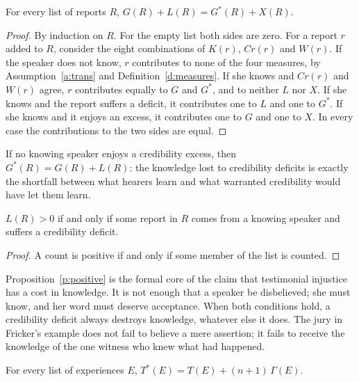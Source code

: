 \documentclass{situationist-preprint}
\begin{document}
\begin{theorem}[Accounting]\label{t:account}
For every list of reports $R$, $G(R) + L(R) = G^{*}(R) + X(R)$.
\end{theorem}

\begin{proof}
By induction on $R$. For the empty list both sides are zero. For a report $r$ added to $R$, consider the eight combinations of $K(r)$, $\mathit{Cr}(r)$ and $W(r)$. If the speaker does not know, $r$ contributes to none of the four measures, by Assumption~\ref{a:trans} and Definition~\ref{d:measures}. If she knows and $\mathit{Cr}(r)$ and $W(r)$ agree, $r$ contributes equally to $G$ and $G^{*}$, and to neither $L$ nor $X$. If she knows and the report suffers a deficit, it contributes one to $L$ and one to $G^{*}$. If she knows and it enjoys an excess, it contributes one to $G$ and one to $X$. In every case the contributions to the two sides are equal.
\end{proof}

\begin{corollary}[Shortfall]\label{c:shortfall}
If no knowing speaker enjoys a credibility excess, then $G^{*}(R) = G(R) + L(R)$: the knowledge lost to credibility deficits is exactly the shortfall between what hearers learn and what warranted credibility would have let them learn.
\end{corollary}

\begin{proposition}\label{p:positive}
$L(R) > 0$ if and only if some report in $R$ comes from a knowing speaker and suffers a credibility deficit.
\end{proposition}

\begin{proof}
A count is positive if and only if some member of the list is counted.
\end{proof}

Proposition~\ref{p:positive} is the formal core of the claim that testimonial injustice has a cost in knowledge. It is not enough that a speaker be disbelieved; she must know, and her word must deserve acceptance. When both conditions hold, a credibility deficit always destroys knowledge, whatever else it does. The jury in Fricker's example does not fail to believe a mere assertion; it fails to receive the knowledge of the one witness who knew what had happened.

\begin{theorem}\label{t:herm}
For every list of experiences $E$, $T^{*}(E) = T(E) + (n+1)\,\Gamma(E)$.
\end{theorem}
\end{document}
